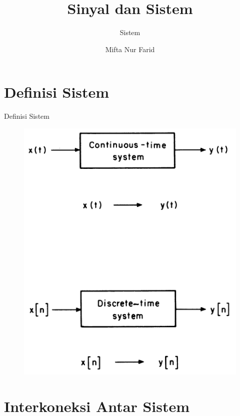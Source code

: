 \documentclass[pdflatex,compress,mathserif]{beamer}
\title{Sinyal dan Sistem}
\subtitle{Sistem}
\author{Mifta Nur Farid}
\begin{document}
\maketitle

\section{Definisi Sistem}

\begin{frame}{Definisi Sistem}
	\begin{figure}
		\centering
		\includegraphics[height=0.8\textheight]{img/02.slide_09}
	\end{figure}
\end{frame}

\section{Interkoneksi Antar Sistem}
\end{document}
